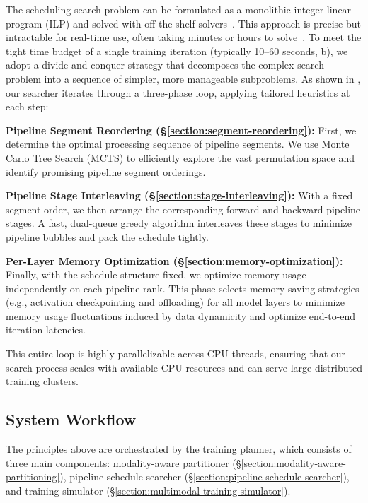 The scheduling search problem can be formulated as a monolithic integer linear program (ILP) and solved with off-the-shelf solvers~\cite{highs,gurobi}.
This approach is precise but intractable for real-time use, often taking minutes or hours to solve~\cite{recycle-sosp24}.
To meet the tight time budget of a single training iteration (typically 10--60 seconds, b), we adopt a divide-and-conquer strategy that decomposes the complex search problem into a sequence of simpler, more manageable subproblems. As shown in , our searcher iterates through a three-phase loop, applying tailored heuristics at each step:

\textbf{ Pipeline Segment Reordering (\S\ref{section:segment-reordering}):} First, we determine the optimal processing sequence of pipeline segments. We use Monte Carlo Tree Search (MCTS) to efficiently explore the vast permutation space and identify promising pipeline segment orderings.

\textbf{ Pipeline Stage Interleaving (\S\ref{section:stage-interleaving}):} With a fixed segment order, we then arrange the corresponding forward and backward pipeline stages. A fast, dual-queue greedy algorithm interleaves these stages to minimize pipeline bubbles and pack the schedule tightly.


\textbf{ Per-Layer Memory Optimization (\S\ref{section:memory-optimization}):} Finally, with the schedule structure fixed, we optimize memory usage independently on each pipeline rank. This phase selects memory-saving strategies (e.g., activation checkpointing and offloading) for all model layers to minimize memory usage fluctuations induced by data dynamicity and optimize end-to-end iteration latencies.

This entire loop is highly parallelizable across CPU threads, ensuring that our search process scales with available CPU resources and can serve large distributed training clusters.

\subsection{System Workflow}
\label{section:dip-overview}

The principles above are orchestrated by the \sys{} training planner, which consists of three main components: modality-aware partitioner (\S\ref{section:modality-aware-partitioning}), pipeline schedule searcher (\S\ref{section:pipeline-schedule-searcher}), and training simulator (\S\ref{section:multimodal-training-simulator}).

